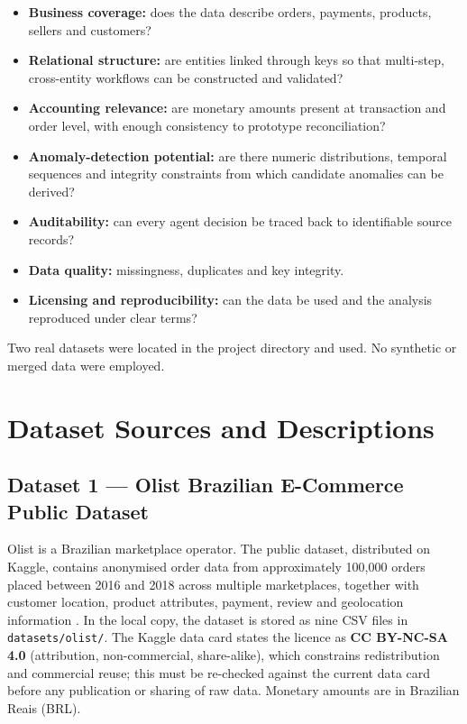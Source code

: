 \documentclass[11pt,a4paper]{article}
\newcommand{\code}[1]{\texttt{#1}}
\begin{document}
\begin{itemize}
\item \textbf{Business coverage:} does the data describe orders, payments, products, sellers and customers?
\item \textbf{Relational structure:} are entities linked through keys so that multi-step, cross-entity workflows can be constructed and validated?
\item \textbf{Accounting relevance:} are monetary amounts present at transaction and order level, with enough consistency to prototype reconciliation?
\item \textbf{Anomaly-detection potential:} are there numeric distributions, temporal sequences and integrity constraints from which candidate anomalies can be derived?
\item \textbf{Auditability:} can every agent decision be traced back to identifiable source records?
\item \textbf{Data quality:} missingness, duplicates and key integrity.
\item \textbf{Licensing and reproducibility:} can the data be used and the analysis reproduced under clear terms?
\end{itemize}

Two real datasets were located in the project directory and used. No synthetic or merged data were employed.

\section{Dataset Sources and Descriptions}
\subsection*{Dataset 1 --- Olist Brazilian E-Commerce Public Dataset}
Olist is a Brazilian marketplace operator. The public dataset, distributed on Kaggle, contains anonymised order data from approximately 100{,}000 orders placed between 2016 and 2018 across multiple marketplaces, together with customer location, product attributes, payment, review and geolocation information \cite{olistDataset}. In the local copy, the dataset is stored as nine CSV files in \code{datasets/olist/}. The Kaggle data card states the licence as \textbf{CC BY-NC-SA 4.0} (attribution, non-commercial, share-alike), which constrains redistribution and commercial reuse; this must be re-checked against the current data card before any publication or sharing of raw data. Monetary amounts are in Brazilian Reais (BRL).
\end{document}
